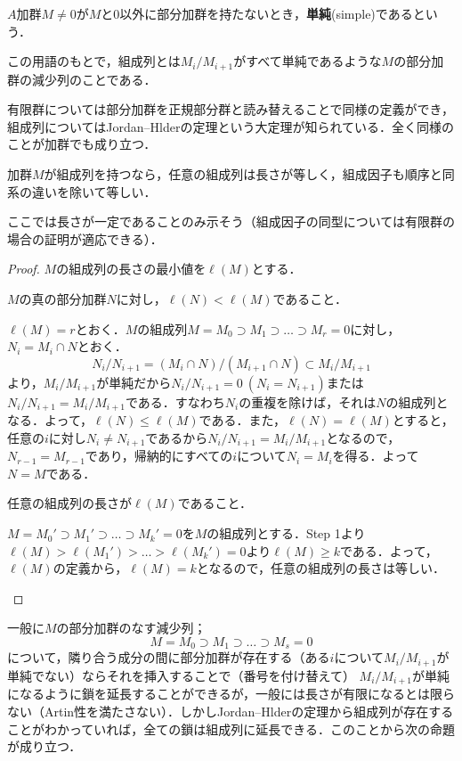 \begin{defi}[単純加群]
	$A$加群$M\neq0$が$M$と0以外に部分加群を持たないとき，\textbf{単純}(simple)であるという．
\end{defi}

この用語のもとで，組成列とは$M_i/M_{i+1}$がすべて単純であるような$M$の部分加群の減少列のことである．

有限群については部分加群を正規部分群と読み替えることで同様の定義ができ，組成列についてはJordan--Hlderの定理という大定理が知られている．全く同様のことが加群でも成り立つ．

\begin{thm}
	加群$M$が組成列を持つなら，任意の組成列は長さが等しく，組成因子も順序と同系の違いを除いて等しい．
\end{thm}

ここでは長さが一定であることのみ示そう（組成因子の同型については有限群の場合の証明が適応できる）．

\begin{proof}
	$M$の組成列の長さの最小値を$\ell(M)$とする．
	\begin{step}
		\item $M$の真の部分加群$N$に対し，$\ell(N)<\ell(M)$であること．
		
		$\ell(M)=r$とおく．$M$の組成列$M=M_0\supset M_1\supset\dots\supset M_r=0$に対し，$N_i=M_i\cap N$とおく．
		\[N_i/N_{i+1}=(M_i\cap N)/(M_{i+1}\cap N)\subset M_i/M_{i+1}\]
		より，$M_i/M_{i+1}$が単純だから$N_i/N_{i+1}=0~(N_i=N_{i+1})$または$N_i/N_{i+1}=M_i/M_{i+1}$である．すなわち$N_i$の重複を除けば，それは$N$の組成列となる．よって，$\ell(N)\leq\ell(M)$である．また，$\ell(N)=\ell(M)$とすると，任意の$i$に対し$N_i\neq N_{i+1}$であるから$N_i/N_{i+1}=M_i/M_{i+1}$となるので，$N_{r-1}=M_{r-1}$であり，帰納的にすべての$i$について$N_i=M_i$を得る．よって$N=M$である．
		
		\item 任意の組成列の長さが$\ell(M)$であること．
		
		$M={M_0}'\supset{M_1}'\supset\dots\supset{M_k}'=0$を$M$の組成列とする．Step 1より$\ell(M)>\ell({M_1}')>\dots>\ell({M_k}')=0$より$\ell(M)\geq k$である．よって，$\ell(M)$の定義から，$\ell(M)=k$となるので，任意の組成列の長さは等しい．
	\end{step}
\end{proof}

一般に$M$の部分加群のなす減少列；
\[M=M_0\supset M_1\supset\dots\supset M_s=0\]
について，隣り合う成分の間に部分加群が存在する（ある$i$について$M_i/M_{i+1}$が単純でない）ならそれを挿入することで（番号を付け替えて）
$M_i/M_{i+1}$が単純になるように鎖を延長することができるが，一般には長さが有限になるとは限らない（Artin性を満たさない）．しかしJordan--Hlderの定理から組成列が存在することがわかっていれば，全ての鎖は組成列に延長できる．このことから次の命題が成り立つ．

